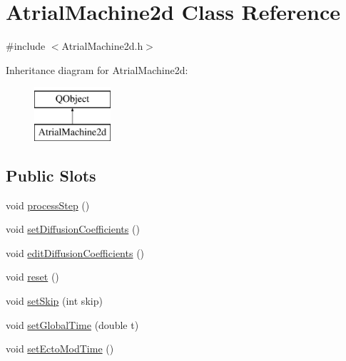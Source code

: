 \hypertarget{class_atrial_machine2d}{\section{Atrial\+Machine2d Class Reference}
\label{class_atrial_machine2d}
}


{\ttfamily \#include $<$Atrial\+Machine2d.\+h$>$}

Inheritance diagram for Atrial\+Machine2d\+:\begin{figure}[H]
\begin{center}
\leavevmode
\includegraphics[height=2.000000cm]{class_atrial_machine2d}
\end{center}
\end{figure}
\subsection*{Public Slots}
\begin{DoxyCompactItemize}
\item 
void \hyperlink{class_atrial_machine2d_ac298c084be8e7a01ec02bbdaea49c493}{process\+Step} ()
\item 
void \hyperlink{class_atrial_machine2d_a23d7a0f70a9ddda7dfffc13df9c9964a}{set\+Diffusion\+Coefficients} ()
\item 
void \hyperlink{class_atrial_machine2d_a75d9bb70add513fe3bed06c714842bff}{edit\+Diffusion\+Coefficients} ()
\item 
void \hyperlink{class_atrial_machine2d_a3c509a3d7d9da2b758caa7347bb3ea78}{reset} ()
\item 
void \hyperlink{class_atrial_machine2d_a5e5d865f2142795acca445437cc2346d}{set\+Skip} (int skip)
\item 
void \hyperlink{class_atrial_machine2d_abc84bef4b3b1a84a4959e820dea21fc3}{set\+Global\+Time} (double t)
\item 
void \hyperlink{class_atrial_machine2d_afeca8099f6767e7850ba1bd305dc9ed7}{set\+Ecto\+Mod\+Time} ()
\end{DoxyCompactItemize}
